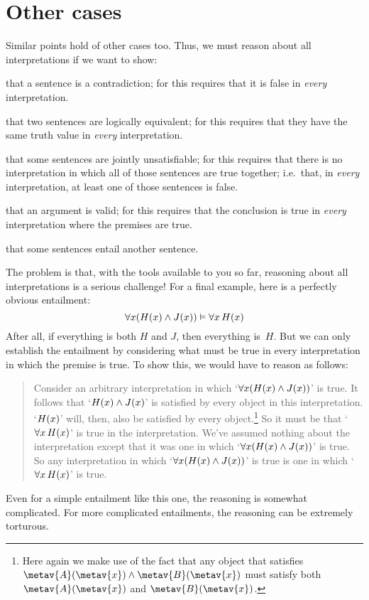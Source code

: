 \section{Other cases}
Similar points hold of other cases too. Thus, we must reason about all interpretations if we want to show:
	\begin{ebullet}
		\item that a sentence is a contradiction; for this requires that it is false in \emph{every} interpretation.
		\item that two sentences are logically equivalent; for this requires that they have the same truth value in \emph{every} interpretation.
		\item that some sentences are jointly unsatisfiable; for this requires that there is no interpretation in which all of those sentences are true together; i.e.\ that, in \emph{every} interpretation, at  least one of those sentences is false.
		\item that an argument is valid; for this requires that the conclusion is true in \emph{every} interpretation where the premises are true.
		\item that some sentences entail another sentence.
	\end{ebullet}
The problem is that, with the tools available to you so far, reasoning about all interpretations is a serious challenge! For a final example, here is a perfectly obvious entailment:
	$$\forall x(\mathord{H}(x) \wedge \mathord{J}(x)) \vDash \forall x\, \mathord{H}(x)$$
After all, if everything is both $H$ and $J$, then everything is~$H$. But we can only establish the entailment by considering what must be true in every interpretation in which the premise is true. To show this, we would have to reason as follows:
	\begin{quote}
		Consider an arbitrary interpretation in which `$\forall x(\mathord{H}(x) \wedge \mathord{J}(x))$' is true. It follows that `$\mathord{H}(x) \wedge \mathord{J}(x)$' is satisfied by every object in this interpretation. `$\mathord{H}(x)$' will, then, also be satisfied by every object.\footnote{Here again we make use of the fact that any object that satisfies $\metav{A}(\metav{x}) \land \metav{B}(\metav{x})$ must satisfy both $\metav{A}(\metav{x})$ and $\metav{B}(\metav{x})$.} So it must be that `$\forall x\, \mathord{H}(x)$' is true in the  interpretation. We've assumed nothing about the interpretation except that it was one in which `$\forall x(\mathord{H}(x) \wedge \mathord{J}(x))$' is true. So any interpretation in which `$\forall x(\mathord{H}(x) \wedge \mathord{J}(x))$' is true is one in which `$\forall x\, \mathord{H}(x)$' is true.
\end{quote}
Even for a simple entailment like this one, the reasoning is somewhat complicated. For more complicated entailments, the reasoning can be extremely torturous.

